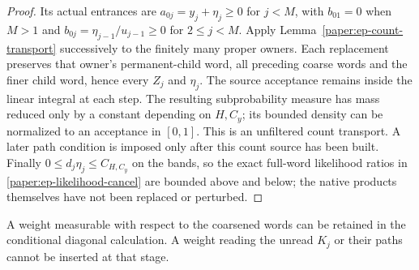 \begin{proof}
Its actual entrances are $a_{0j}=y_j+\eta_j\geq0$ for $j<M$,
with $b_{01}=0$ when $M>1$ and
$b_{0j}=\eta_{j-1}/u_{j-1}\geq0$ for $2\leq j<M$.
Apply Lemma~\ref{paper:ep-count-transport} successively to the
finitely many proper owners.  Each replacement preserves that owner's
permanent-child word, all preceding coarse words and the finer child
word, hence every $Z_j$ and $\eta_j$.  The source acceptance remains
inside the linear integral at each step.  The resulting subprobability
measure has mass reduced only by a constant depending on $H,C_y$; its bounded
density can be normalized to an acceptance in $[0,1]$.
This is an unfiltered count transport.  A later path condition is
imposed only after this count source has been built.
Finally $0\leq d_j\eta_j\leq C_{H,C_y}$ on the bands, so the exact
full-word likelihood ratios in \eqref{paper:ep-likelihood-cancel}
are bounded above and below; the native products themselves have not
been replaced or perturbed.
\end{proof}
A weight measurable with respect to the coarsened words can be retained
in the conditional diagonal calculation.  A weight reading the unread
$K_j$ or their paths cannot be inserted at that stage.


